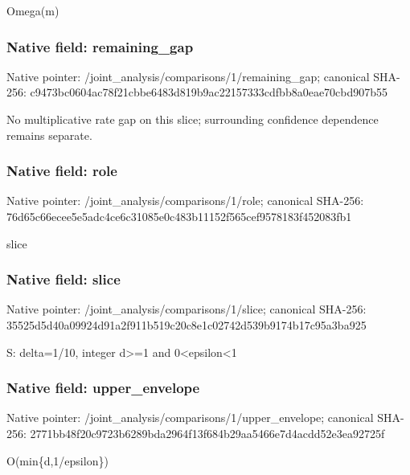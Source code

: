 \documentclass[10pt,a4paper]{article}
\begin{document}
\begingroup\raggedright\sloppy Omega(m)\par\endgroup

\subsubsection{Native field: remaining\_\allowbreak{}gap}
Native pointer: /joint\_\allowbreak{}analysis/comparisons/1/remaining\_\allowbreak{}gap; canonical SHA-256: c9473bc0604ac78f21cbbe6483d819b9ac22157333cdfbb8a0eae70cbd907b55

\begingroup\raggedright\sloppy No multiplicative rate gap on this slice;\allowbreak{} surrounding confidence dependence remains separate.\par\endgroup

\subsubsection{Native field: role}
Native pointer: /joint\_\allowbreak{}analysis/comparisons/1/role; canonical SHA-256: 76d65c66ecee5e5adc4ce6c31085e0c483b11152f565cef9578183f452083fb1

\begingroup\raggedright\sloppy slice\par\endgroup

\subsubsection{Native field: slice}
Native pointer: /joint\_\allowbreak{}analysis/comparisons/1/slice; canonical SHA-256: 35525d5d40a09924d91a2f911b519c20c8e1c02742d539b9174b17c95a3ba925

\begingroup\raggedright\sloppy S:\allowbreak{} delta=\allowbreak{}1/\allowbreak{}10,\allowbreak{} integer d>=\allowbreak{}1 and 0<epsilon<1\par\endgroup

\subsubsection{Native field: upper\_\allowbreak{}envelope}
Native pointer: /joint\_\allowbreak{}analysis/comparisons/1/upper\_\allowbreak{}envelope; canonical SHA-256: 2771bb48f20c9723b6289bda2964f13f684b29aa5466e7d4acdd52e3ea92725f

\begingroup\raggedright\sloppy O(min\{d,\allowbreak{}1/\allowbreak{}epsilon\})\par\endgroup
\end{document}

